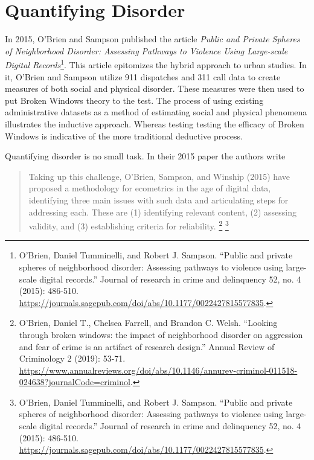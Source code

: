 \documentclass[
]{book}
\begin{document}
\hypertarget{quantifying-disorder}{%
\section{Quantifying Disorder}\label{quantifying-disorder}}

In 2015, O'Brien and Sampson published the article \emph{Public and Private Spheres of Neighborhood Disorder: Assessing Pathways to Violence Using Large-scale Digital Records}\footnote{O'Brien, Daniel Tumminelli, and Robert J. Sampson. ``Public and private spheres of neighborhood disorder: Assessing pathways to violence using large-scale digital records.'' Journal of research in crime and delinquency 52, no. 4 (2015): 486-510. \url{https://journals.sagepub.com/doi/abs/10.1177/0022427815577835}.}. This article epitomizes the hybrid approach to urban studies. In it, O'Brien and Sampson utilize 911 dispatches and 311 call data to create measures of both social and physical disorder. These measures were then used to put Broken Windows theory to the test. The process of using existing administrative datasets as a method of estimating social and physical phenomena illustrates the inductive approach. Whereas testing testing the efficacy of Broken Windows is indicative of the more traditional deductive process.

Quantifying disorder is no small task. In their 2015 paper the authors write

\begin{quote}
Taking up this challenge, O'Brien, Sampson, and Winship (2015) have proposed a methodology for ecometrics in the age of digital data, identifying three main issues with such data and articulating steps for addressing each. These are (1) identifying relevant content, (2) assessing validity, and (3) establishing criteria for reliability. \footnote{O'Brien, Daniel T., Chelsea Farrell, and Brandon C. Welsh. ``Looking through broken windows: the impact of neighborhood disorder on aggression and fear of crime is an artifact of research design.'' Annual Review of Criminology 2 (2019): 53-71. \url{https://www.annualreviews.org/doi/abs/10.1146/annurev-criminol-011518-024638?journalCode=criminol}.} \footnote{O'Brien, Daniel Tumminelli, and Robert J. Sampson. ``Public and private spheres of neighborhood disorder: Assessing pathways to violence using large-scale digital records.'' Journal of research in crime and delinquency 52, no. 4 (2015): 486-510. \url{https://journals.sagepub.com/doi/abs/10.1177/0022427815577835}.}
\end{quote}
\end{document}

